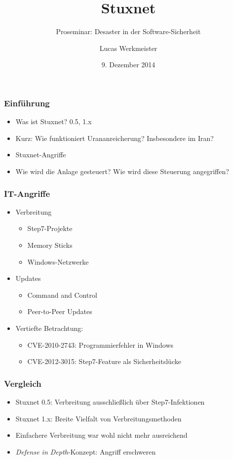 \documentclass{beamer}
\title{Stuxnet}
\subtitle{Proseminar: Desaster in der Software-Sicherheit}
\author{Lucas Werkmeister}
\date{9. Dezember 2014}
\begin{document}
\begin{frame}
  \titlepage
\end{frame}

\begin{frame}
  \frametitle{Einführung}
  \begin{itemize}
    \item Was ist Stuxnet? 0.5, 1.x
    \item Kurz: Wie funktioniert Urananreicherung? Insbesondere im Iran?
    \item Stuxnet-Angriffe
    \item Wie wird die Anlage gesteuert? Wie wird diese Steuerung angegriffen?
  \end{itemize}
\end{frame}

\begin{frame}
  \frametitle{IT-Angriffe} %
  \begin{itemize}
    \item Verbreitung
      \begin{itemize}
        \item Step7-Projekte
        \item Memory Sticks
        \item Windows-Netzwerke
      \end{itemize}
    \item Updates
      \begin{itemize}
        \item Command and Control
        \item Peer-to-Peer Updates
      \end{itemize}
    \item Vertiefte Betrachtung:
      \begin{itemize}
        \item CVE-2010-2743: Programmierfehler in Windows
        \item CVE-2012-3015: Step7-Feature als Sicherheitslücke
      \end{itemize}
  \end{itemize}
\end{frame}

\begin{frame}
  \frametitle{Vergleich}
  \begin{itemize}
    \item Stuxnet 0.5: Verbreitung ausschließlich über Step7-Infektionen
    \item Stuxnet 1.x: Breite Vielfalt von Verbreitungsmethoden
    \item Einfachere Verbreitung war wohl nicht mehr ausreichend
    \item \emph{Defense in Depth}-Konzept: Angriff erschweren
  \end{itemize}
\end{frame}
\end{document}

